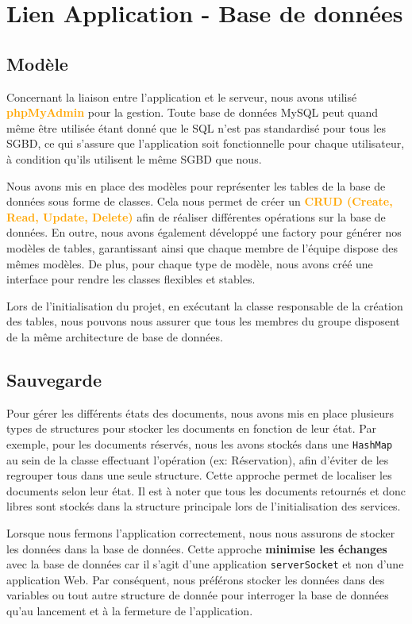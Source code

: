 \chapter{Lien Application - Base de données}


\section{Modèle}

Concernant la liaison entre l’application et le serveur, nous avons utilisé \textbf{\textcolor{orange}{phpMyAdmin}} pour la gestion. Toute base de données MySQL peut quand même être utilisée étant donné que le SQL n’est pas standardisé pour tous les SGBD, ce qui s’assure que l’application soit fonctionnelle pour chaque utilisateur, à condition qu’ils utilisent le même SGBD que nous.

Nous avons mis en place des modèles pour représenter les tables de la base de données sous forme de classes. Cela nous permet de créer un \textbf{\textcolor{orange}{CRUD (Create, Read, Update, Delete)}} afin de réaliser différentes opérations sur la base de données. En outre, nous avons également développé une factory pour générer nos modèles de tables, garantissant ainsi que chaque membre de l’équipe dispose des mêmes modèles. De plus, pour chaque type de modèle, nous avons créé une interface pour rendre les classes flexibles et stables.

Lors de l’initialisation du projet, en exécutant la classe responsable de la création des tables, nous pouvons nous assurer que tous les membres du groupe disposent de la même architecture de base de données.


\section{Sauvegarde}

Pour gérer les différents états des documents, nous avons mis en place plusieurs types de structures pour stocker les documents en fonction de leur état. Par exemple, pour les documents réservés, nous les avons stockés dans une \texttt{HashMap} au sein de la classe effectuant l'opération (ex: Réservation), afin d'éviter de les regrouper tous dans une seule structure. Cette approche permet de localiser les documents selon leur état. Il est à noter que tous les documents retournés et donc libres sont stockés dans la structure principale lors de l'initialisation des services.

Lorsque nous fermons l’application correctement, nous nous assurons de stocker les données dans la base de données. Cette approche \textbf{minimise les échanges} avec la base de données car il s’agit d’une application \texttt{serverSocket} et non d’une application Web. Par conséquent, nous préférons stocker les données dans des variables ou tout autre structure de donnée pour interroger la base de données qu’au lancement et à la fermeture de l’application.
